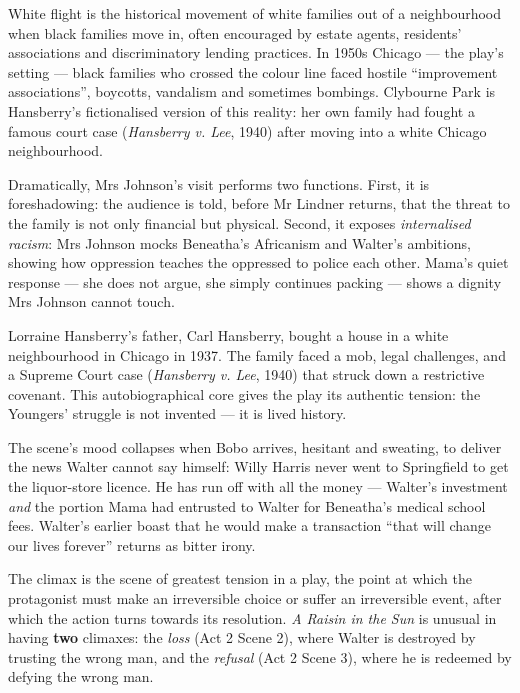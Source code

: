 \documentclass[11pt]{article}
\newcommand{\cle}[1]{{\popxbold\color{popdark}#1}}
\newcounter{popsec}
\newcounter{popsub}
\newcommand{\courssub}[1]{%
  \stepcounter{popsub}%
  \par\vspace{9pt}\noindent{\popxbold\fontsize{11.5}{13}\selectfont\color{popink}{\color{poporange}\thepopsec.\thepopsub}\hspace{6pt}#1}\par\nopagebreak\vspace{4pt}
}
\begin{document}
\begin{definition}
\cle{White flight} is the historical movement of white families out of a neighbourhood when black families move in, often encouraged by estate agents, residents' associations and discriminatory lending practices. In 1950s Chicago — the play's setting — black families who crossed the colour line faced hostile ``improvement associations'', boycotts, vandalism and sometimes bombings. Clybourne Park is Hansberry's fictionalised version of this reality: her own family had fought a famous court case (\emph{Hansberry v. Lee}, 1940) after moving into a white Chicago neighbourhood.
\end{definition}

Dramatically, Mrs Johnson's visit performs two functions. First, it is \cle{foreshadowing}: the audience is told, before Mr Lindner returns, that the threat to the family is not only financial but physical. Second, it exposes \emph{internalised racism}: Mrs Johnson mocks Beneatha's Africanism and Walter's ambitions, showing how oppression teaches the oppressed to police each other. Mama's quiet response — she does not argue, she simply continues packing — shows a dignity Mrs Johnson cannot touch.

\begin{savaistu}
Lorraine Hansberry's father, Carl Hansberry, bought a house in a white neighbourhood in Chicago in 1937. The family faced a mob, legal challenges, and a Supreme Court case (\emph{Hansberry v. Lee}, 1940) that struck down a restrictive covenant. This autobiographical core gives the play its authentic tension: the Youngers' struggle is not invented — it is lived history.
\end{savaistu}

\courssub{Climax 1: The Loss — Willy's Betrayal}

The scene's mood collapses when Bobo arrives, hesitant and sweating, to deliver the news Walter cannot say himself: \cle{Willy Harris} never went to Springfield to get the liquor-store licence. He has run off with all the money — Walter's investment \emph{and} the portion Mama had entrusted to Walter for Beneatha's medical school fees. Walter's earlier boast that he would make a transaction ``that will change our lives forever'' returns as bitter irony.

\begin{definition}
The \cle{climax} is the scene of greatest tension in a play, the point at which the protagonist must make an irreversible choice or suffer an irreversible event, after which the action turns towards its resolution. \emph{A Raisin in the Sun} is unusual in having \textbf{two} climaxes: the \emph{loss} (Act 2 Scene 2), where Walter is destroyed by trusting the wrong man, and the \emph{refusal} (Act 2 Scene 3), where he is redeemed by defying the wrong man.
\end{definition}
\end{document}
